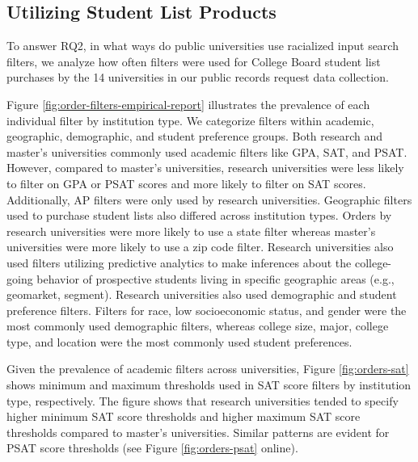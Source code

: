 \documentclass[
  12pt,
]{article}
\begin{document}
\hypertarget{utilizing-student-list-products-1}{%
\subsection{Utilizing Student List Products}\label{utilizing-student-list-products-1}}

To answer RQ2, in what ways do public universities use racialized input search filters, we analyze how often filters were used for College Board student list purchases by the 14 universities in our public records request data collection.

Figure \ref{fig:order-filters-empirical-report} illustrates the prevalence of each individual filter by institution type. We categorize filters within academic, geographic, demographic, and student preference groups. Both research and master's universities commonly used academic filters like GPA, SAT, and PSAT. However, compared to master's universities, research universities were less likely to filter on GPA or PSAT scores and more likely to filter on SAT scores. Additionally, AP filters were only used by research universities. Geographic filters used to purchase student lists also differed across institution types. Orders by research universities were more likely to use a state filter whereas master's universities were more likely to use a zip code filter. Research universities also used filters utilizing predictive analytics to make inferences about the college-going behavior of prospective students living in specific geographic areas (e.g., geomarket, segment). Research universities also used demographic and student preference filters. Filters for race, low socioeconomic status, and gender were the most commonly used demographic filters, whereas college size, major, college type, and location were the most commonly used student preferences.

Given the prevalence of academic filters across universities, Figure \ref{fig:orders-sat} shows minimum and maximum thresholds used in SAT score filters by institution type, respectively. The figure shows that research universities tended to specify higher minimum SAT score thresholds and higher maximum SAT score thresholds compared to master's universities. Similar patterns are evident for PSAT score thresholds (see Figure \ref{fig:orders-psat} online).
\end{document}
